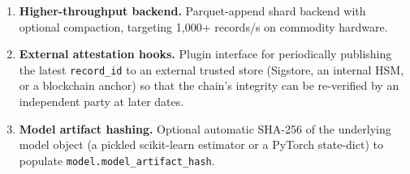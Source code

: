 \begin{enumerate}[leftmargin=*]
    \item \textbf{Higher-throughput backend.} Parquet-append shard backend with optional compaction, targeting 1{,}000+ records/s on commodity hardware.
    \item \textbf{External attestation hooks.} Plugin interface for periodically publishing the latest \texttt{record\_id} to an external trusted store (Sigstore, an internal HSM, or a blockchain anchor) so that the chain's integrity can be re-verified by an independent party at later dates.
    \item \textbf{Model artifact hashing.} Optional automatic SHA-256 of the underlying model object (a pickled scikit-learn estimator or a PyTorch state-dict) to populate \texttt{model.model\_artifact\_hash}.
\end{enumerate}
